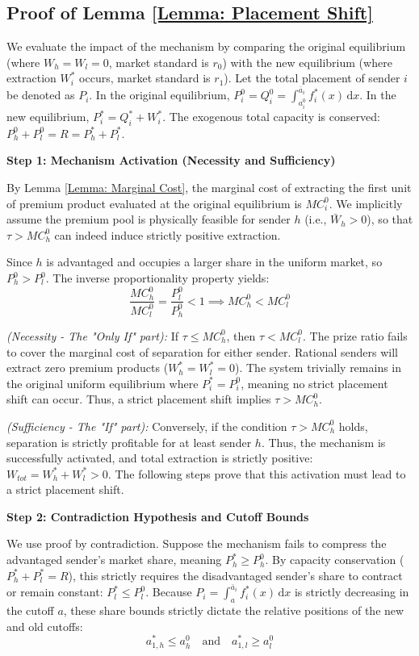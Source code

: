 \documentclass[12pt, a4paper]{article}
\begin{document}
\subsection*{Proof of Lemma \ref{Lemma: Placement Shift}}

We evaluate the impact of the mechanism by comparing the original equilibrium (where $W_h = W_l = 0$, market standard is $r_0$) with the new equilibrium (where extraction $W_i^*$ occurs, market standard is $r_1$). Let the total placement of sender $i$ be denoted as $P_i$. In the original equilibrium, $P_i^0 = Q_i^0 = \int_{a_i^0}^{\bar{a}_i} f_i^*(x) \, \mathrm{d}x$. In the new equilibrium, $P_i^* = Q_i^* + W_i^*$. The exogenous total capacity is conserved: $P_h^0 + P_l^0 = R = P_h^* + P_l^*$. 

\textbf{Step 1: Mechanism Activation (Necessity and Sufficiency)}

By Lemma \ref{Lemma: Marginal Cost}, the marginal cost of extracting the first unit of premium product evaluated at the original equilibrium is $MC_i^0$. We implicitly assume the premium pool is physically feasible for sender $h$ (i.e., $\bar{W}_h>0$), so that $\tau>MC_h^0$ can indeed induce strictly positive extraction.

Since $h$ is advantaged and occupies a larger share in the uniform market, so $P_h^0 > P_l^0$. The inverse proportionality property yields:
\[
    \frac{MC_h^0}{MC_l^0} = \frac{P_l^0}{P_h^0} < 1 \implies MC_h^0 < MC_l^0
\]

\textit{(Necessity - The "Only If" part):} If $\tau \le MC_h^0$, then $\tau < MC_l^0$. The prize ratio fails to cover the marginal cost of separation for either sender. Rational senders will extract zero premium products ($W_h^* = W_l^* = 0$). The system trivially remains in the original uniform equilibrium where $P_i^* = P_i^0$, meaning no strict placement shift can occur. Thus, a strict placement shift implies $\tau > MC_h^0$.

\textit{(Sufficiency - The "If" part):} Conversely, if the condition $\tau > MC_h^0$ holds, separation is strictly profitable for at least sender $h$. Thus, the mechanism is successfully activated, and total extraction is strictly positive: $W_{tot} = W_h^* + W_l^* > 0$. The following steps prove that this activation must lead to a strict placement shift.

\textbf{Step 2: Contradiction Hypothesis and Cutoff Bounds}

We use proof by contradiction. Suppose the mechanism fails to compress the advantaged sender's market share, meaning $P_h^* \ge P_h^0$.
By capacity conservation ($P_h^* + P_l^* = R$), this strictly requires the disadvantaged sender's share to contract or remain constant: $P_l^* \le P_l^0$.
Because $P_i = \int_{a}^{\bar{a}_i} f_i^*(x) \, \mathrm{d}x$ is strictly decreasing in the cutoff $a$, these share bounds strictly dictate the relative positions of the new and old cutoffs:
\[
    a_{1,h}^* \le a_h^0 \quad \text{and} \quad a_{1,l}^* \ge a_l^0
\]
\end{document}

